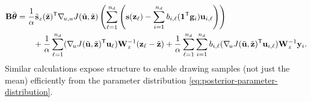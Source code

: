 \begin{align}
    \label{eq:theta-propagation}
    \begin{aligned}
    \mathbf{B}\bar{\boldsymbol{\theta}}
    &= \frac{1}{\alpha}\tilde{\mathbf{s}}_{z}(\tilde{\mathbf{z}})^{\mathsf{T}}\nabla_{\!u,u}J(\tilde{\mathbf{u}},\tilde{\mathbf{z}})\left(
        \sum_{\ell=1}^{n_d}\left(
            \mathbf{s}(\mathbf{z}_{\ell}) - \sum_{i=1}^{n_d} b_{i,\ell}(\mathbf{1}^{\mathsf{T}}\mathbf{g}_i)\mathbf{u}_{i,\ell}
        \right)
    \right)
    \\ &\qquad
    + \frac{1}{\alpha}\sum_{\ell=1}^{n_d}
        (\nabla_{\!u}J(\tilde{\mathbf{u}},\tilde{\mathbf{z}})^{\mathsf{T}}\mathbf{u}_{\ell})\mathbf{W}_{z}^{-1}(\mathbf{z}_\ell - \tilde{\mathbf{z}})
    + \frac{1}{\alpha}\sum_{\ell=1}^{n_d}\sum_{i=1}^{n_d}b_{i,\ell}(\nabla_{\!u}J(\tilde{\mathbf{u}},\tilde{\mathbf{z}})^{\mathsf{T}}\mathbf{u}_{i,\ell})\mathbf{W}_{z}^{-1}\mathbf{y}_i.
    \end{aligned}
\end{align}
Similar calculations expose structure to enable drawing samples (not just the mean) efficiently from the parameter distribution \cref{eq:posterior-parameter-distribution}.


